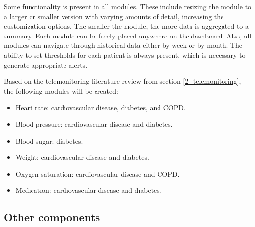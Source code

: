     Some functionality is present in all modules. These include resizing the module to a larger or smaller version with varying amounts of detail, increasing the customization options. The smaller the module, the more data is aggregated to a summary. Each module can be freely placed anywhere on the dashboard. Also, all modules can navigate through historical data either by week or by month. The ability to set thresholds for each patient is always present, which is necessary to generate appropriate alerts.

    Based on the telemonitoring literature review from section \ref{2_telemonitoring}, the following modules will be created:
    \begin{itemize}
        \item Heart rate: cardiovascular disease, diabetes, and COPD.
        \item Blood pressure: cardiovascular disease and diabetes.
        \item Blood sugar: diabetes.
        \item Weight: cardiovascular disease and diabetes.
        \item Oxygen saturation: cardiovascular disease and COPD.
        \item Medication: cardiovascular disease and diabetes.
    \end{itemize}

    \subsection{Other components}

